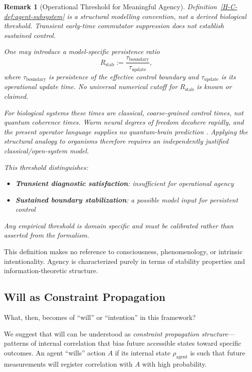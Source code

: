 \documentclass[12pt,a4paper,openany]{book}
\newtheorem{remark}[theorem]{Remark}
\begin{document}
\begin{remark}[Operational Threshold for Meaningful Agency]
\label{H-C-rem:agency-threshold}
Definition~\ref{H-C-def:agent-subsystem} is a structural modelling convention, not a derived biological threshold.  Transient early-time commutator suppression does not establish sustained control.

One may introduce a model-specific persistence ratio
\begin{equation}
R_{\mathrm{stab}}:=\frac{\tau_{\mathrm{boundary}}}{\tau_{\mathrm{update}}},
\end{equation}
where $\tau_{\mathrm{boundary}}$ is persistence of the effective control boundary and $\tau_{\mathrm{update}}$ is its operational update time.  No universal numerical cutoff for $R_{\mathrm{stab}}$ is known or claimed.

For biological systems these times are classical, coarse-grained control times, not quantum coherence times.  Warm neural degrees of freedom decohere rapidly, and the present operator language supplies no quantum-brain prediction \cite{Tegmark2000}.  Applying the structural analogy to organisms therefore requires an independently justified classical/open-system model.

This threshold distinguishes:
\begin{itemize}
\item \textbf{Transient diagnostic satisfaction}: insufficient for operational agency
\item \textbf{Sustained boundary stabilization}: a possible model input for persistent control
\end{itemize}

Any empirical threshold is domain specific and must be calibrated rather than asserted from the formalism.
\end{remark}

This definition makes no reference to consciousness, phenomenology, or intrinsic intentionality. Agency is characterized purely in terms of stability properties and information-theoretic structure.

\subsection{Will as Constraint Propagation}
\label{H-C-sec:II.3}

What, then, becomes of ``will'' or ``intention'' in this framework?

We suggest that will can be understood as \emph{constraint propagation structure}—patterns of internal correlation that bias future accessible states toward specific outcomes. An agent ``wills'' action $A$ if its internal state $\rho_{\text{agent}}$ is such that future measurements will register correlation with $A$ with high probability.
\end{document}
